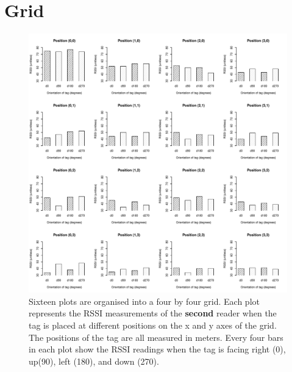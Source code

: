 \newpage
\section{Grid}

\begin{figure}[H]
	\begin{center}
		\includegraphics[width=1\textwidth]{figures/rssi_distance_grid_r2}
		\caption{Sixteen plots are organised into a four by four grid. Each plot represents the RSSI measurements of the \textbf{second} reader when the tag is placed at different positions on the x and y axes of the grid. The positions of the tag are all measured in meters. Every four bars in each plot show the RSSI readings when the tag is facing right (0\textdegree), up(90\textdegree), left (180\textdegree), and down (270\textdegree).}
	\end{center}
\end{figure}

